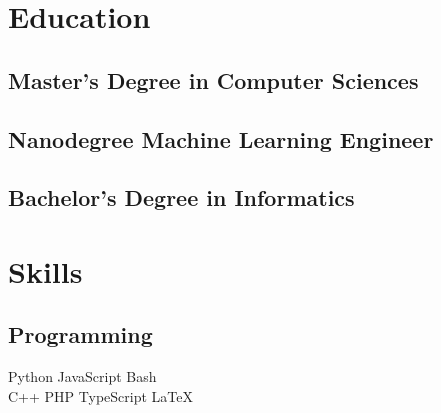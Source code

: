 \documentclass[]{deedy-resume-reversed}
\begin{document}
\hfill
\begin{minipage}[t]{0.33\textwidth}


\fontsize{8pt}{10pt}\selectfont
\section{\fontsize{12}{15}\selectfont Education}

\subsection{\fontsize{10}{12}\selectfont Master's Degree in Computer Sciences}
\sectionsep

\subsection{\fontsize{10}{12}\selectfont Nanodegree Machine Learning Engineer}
\sectionsep

\subsection{\fontsize{10}{12}\selectfont Bachelor's Degree in Informatics}
\sectionsep


\section{\fontsize{12}{15}\selectfont Skills}
\subsection{\fontsize{10}{12}\selectfont Programming}
Python \textbullet{} JavaScript \textbullet{} Bash \\
C++ \textbullet{} PHP \textbullet{} TypeScript \textbullet{} LaTeX\\
\sectionsep


\end{minipage}
\end{document}

